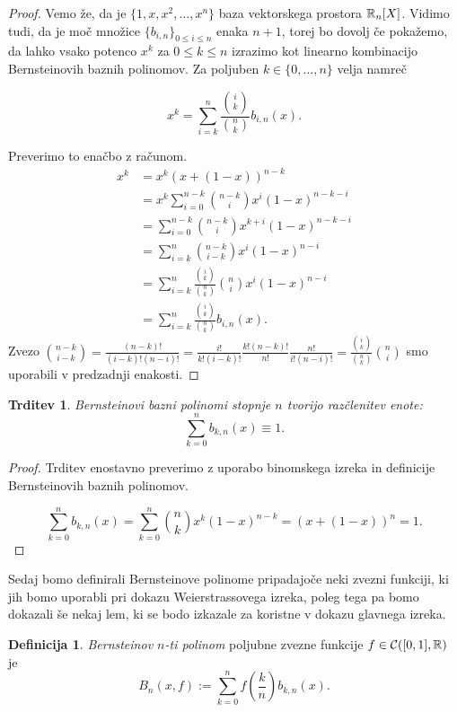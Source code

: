 \documentclass[a4paper, reqno]{amsart}
\theoremstyle{theorem}
\newtheorem{trditev}[izrek]{Trditev}
\theoremstyle{definition}
\newtheorem{definicija}{Definicija}[section]
\begin{document}
\begin{proof}
	Vemo že, da je $\{1, x, x^2, \dots, x^n\}$ baza vektorskega prostora $\mathbb{R}_n[X]$.
	Vidimo tudi, da je moč množice $\{b_{i,n}\}_{0 \leq i \leq n}$ enaka $n + 1$,
	torej bo dovolj če pokažemo, da lahko vsako potenco $x^k$ za $0 \leq k \leq n$
	izrazimo kot linearno kombinacijo Bernsteinovih baznih polinomov. Za poljuben 
	$k \in \{0, \dots, n\}$ velja namreč

	$$ x^k = \sum_{i = k}^{n} \frac{\binom ik}{\binom nk} b_{i, n}(x)\text{.}$$

	Preverimo to enačbo z računom.
	\begin{align*}
	x^k &= x^k(x + (1 - x))^{n - k} \\
	&= x^k \sum_{i = 0}^{n - k} \binom{n - k}{i} x^i(1 - x)^{n - k - i} \\
	&= \sum_{i = 0}^{n - k} \binom{n - k}{i} x^{k + i}(1 - x)^{n - k - i} \\
	&= \sum_{i = k}^{n} \binom{n - k}{i - k} x^i(1 - x)^{n - i}\\
	&= \sum_{i = k}^{n} \frac{\binom ik}{\binom nk} \binom ni x^i(1 - x)^{n - i} \\
	&= \sum_{i = k}^{n} \frac{\binom ik}{\binom nk} b_{i, n}(x)\text{.}
	\end{align*}
	Zvezo 
	$ \binom{n - k}{i - k} = \frac{(n - k)!}{(i - k)!(n - i)!} =
	\frac{i!}{k!(i - k)!} \frac{k! (n - k)!}{n!} \frac{n!}{i!(n - i)!} =
	\frac{\binom ik}{\binom nk} \binom ni $ smo uporabili v predzadnji enakosti.
\end{proof}

\begin{trditev}
	\label{razclenitev enote}
	Bernsteinovi bazni polinomi stopnje $n$ tvorijo razčlenitev enote:
	$$ \sum_{k=0}^{n}b_{k, n}(x) \equiv 1\text{.}$$
\end{trditev}

\begin{proof}
	Trditev enostavno preverimo z uporabo binomskega izreka in definicije 
	Bernsteinovih baznih polinomov.

	$$ \sum_{k=0}^{n}b_{k, n}(x) = 
	\sum_{k=0}^{n} \binom nk x^k(1 - x)^{n - k} = 
	(x + (1 - x))^n = 1 \text{.}$$
\end{proof}

Sedaj bomo definirali Bernsteinove polinome pripadajoče neki zvezni funkciji, 
ki jih bomo uporabli pri dokazu Weierstrassovega
izreka, poleg tega pa bomo dokazali še nekaj lem, ki se bodo izkazale za koristne
v dokazu glavnega izreka. 

\begin{definicija}
	\emph{Bernsteinov $n$-ti polinom} poljubne zvezne funkcije $f \in \mathcal{C}([0,1],\mathbb{R})$ je
	$$ B_n(x, f) := \sum_{k = 0}^n f\left(\frac kn\right)b_{k,n}(x)\text{.}$$

\end{definicija}
\end{document}
